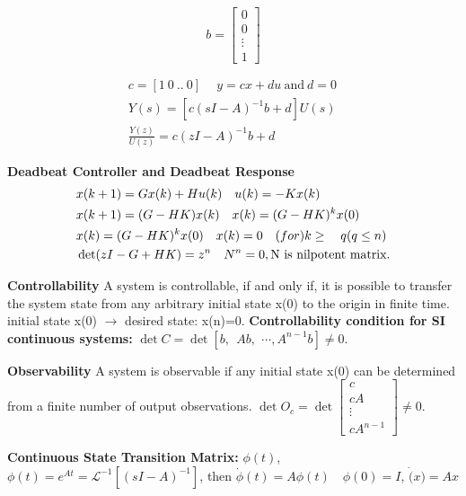 \vspace*{-0.90cm}

\begin{minipage}[h]{0.25\linewidth}
\[
b = \begin{bmatrix}
0 \\
0 \\
\vdots \\
1
\end{bmatrix}
\]
\end{minipage}
\begin{minipage}[h]{0.75\linewidth}
\begin{align*}
& c = [1 \ 0 \ .. \ 0] \ \quad y =cx+du \ \text{and} \ d=0 \\
& Y(s) = [c(sI-A)^{-1}b+d]U(s) \quad \\ 
& \frac{Y(z)}{U(z)} = c(zI-A)^{-1}b+d 
\end{align*}
\end{minipage}
\textbf{Deadbeat Controller and Deadbeat Response}
\vspace*{-0.25cm}
\begin{align*}
& x(k+1)=Gx(k)+Hu(k) \quad u(k)=-Kx(k) \\
& x(k+1)=(G-HK)x(k) \quad x(k)=(G-HK)^kx(0) \\
& x(k) = (G-HK)^kx(0) \quad x(k) =0 \quad \text(for) k \geq \quad q (q \leq n) \\
& \det(zI-G+HK)=z^n \quad N^n =0, \text{N is nilpotent matrix.}
\end{align*}
\vspace*{-0.7cm}

\textbf{Controllability} A system is controllable, if and only if, it is possible to transfer the system state from any arbitrary initial state x(0) to the origin in finite time. initial state x(0) $\rightarrow$ desired state: x(n)=0.%
%
\textbf{Controllability condition for SI continuous systems:} $\det C = \det[b, \ \ Ab, \ \, \cdots, A^{n-1}b] \neq 0$.

\textbf{Observability} A system is observable if any initial state x(0) can be determined from a finite number of output observations. $\det O_c = \det \begin{bmatrix} 
c \\ cA \\ \vdots \\ cA^{n-1} \end{bmatrix} \neq 0$.

\textbf{Continuous State Transition Matrix:} $\phi(t)$,
$\phi(t)=e^{At}= \mathcal{L}^{-1}[(sI-A)^{-1}]$, then $\dot{\phi}(t)=A\phi(t) \quad \phi(0)=I$, $\dot(x)=Ax$ %

